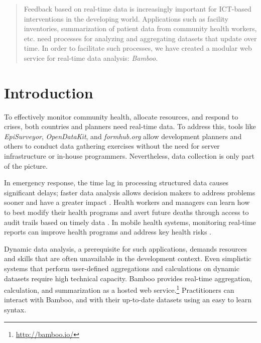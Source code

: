 \documentclass{sig-alternate}
\begin{document}
\maketitle
\begin{abstract}
Feedback based on real-time data is increasingly important for ICT-based interventions in the developing world. Applications such as 
facility inventories,
summarization of patient data from community health workers, 
etc. need processes for analyzing and aggregating datasets that update over
time. In order to facilitate such processes, we have created a modular web
service for real-time data analysis: \emph{Bamboo}.
\end{abstract}




\section{Introduction}
To effectively monitor community health, allocate resources, and respond to crises, both countries and planners need real-time data. 
To address this, tools like \emph{EpiSurveyor}, \emph{OpenDataKit}, and
\emph{formhub.org} allow development planners and others to conduct data gathering exercises without the need for server infrastructure or in-house programmers.  
Nevertheless, data collection is only part of the picture.

In emergency response, the time lag in processing structured data causes significant delays; faster data analysis allows decision makers to address problems sooner and have a greater impact \cite{internews}.
Health workers and managers can learn how to best modify their health programs
and avert future deaths
through access to audit trails based on timely data \cite{krisberg}.
In mobile health systems, monitoring real-time reports can improve health programs and address key health risks \cite{mechael}.  

Dynamic data analysis, a prerequisite for such applications, demands resources
and skills that are often unavailable in the development context.  Even
simplistic systems that perform user-defined aggregations and calculations on
dynamic datasets require high technical capacity.  Bamboo provides real-time
aggregation, calculation, and summarization as a hosted web
service.\footnote{\url{http://bamboo.io/}}  Practitioners can interact with
Bamboo, and with their up-to-date datasets using an easy to learn syntax.
\end{document}
